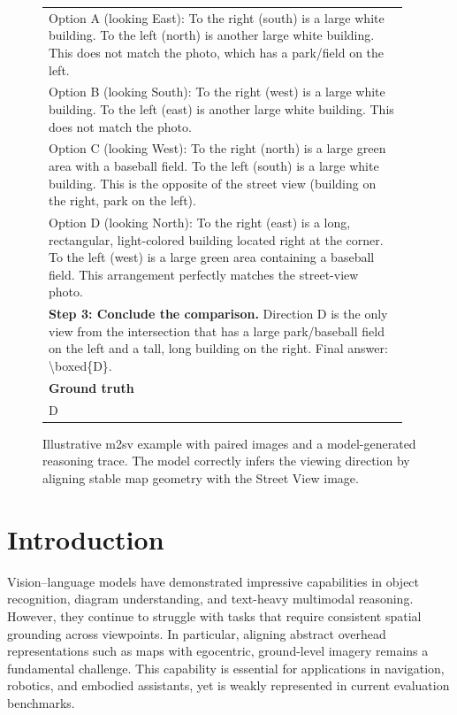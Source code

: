 \documentclass{article}
\begin{document}
\begin{figure}[!t]
\begin{minipage}[t]{0.71\linewidth}
\begin{tabular}{p{0.96\linewidth}}
      Option A (looking East): To the right (south) is a large white building. To the left (north) is another large white building. This does not match the photo, which has a park/field on the left. \\
      Option B (looking South): To the right (west) is a large white building. To the left (east) is another large white building. This does not match the photo. \\
      Option C (looking West): To the right (north) is a large green area with a baseball field. To the left (south) is a large white building. This is the opposite of the street view (building on the right, park on the left). \\
      Option D (looking North): To the right (east) is a long, rectangular, light-colored building located right at the corner. To the left (west) is a large green area containing a baseball field. This arrangement perfectly matches the street-view photo. \\
      \textbf{Step 3: Conclude the comparison.} Direction D is the only view from the intersection that has a large park/baseball field on the left and a tall, long building on the right. Final answer: \textbackslash boxed\{D\}. \\
      \midrule
      \textbf{Ground truth} \\
      D \\
      \bottomrule
    \end{tabular}
  \end{minipage}

  \caption{Illustrative m2sv example with paired images and a model-generated
  reasoning trace. The model correctly infers the viewing direction by aligning
  stable map geometry with the Street View image.}
  \label{fig:m2sv-example}
\end{figure}

\section{Introduction}

Vision--language models have demonstrated impressive capabilities in object
recognition, diagram understanding, and text-heavy multimodal reasoning.
However, they continue to struggle with tasks that require consistent spatial
grounding across viewpoints. In particular, aligning abstract overhead
representations such as maps with egocentric, ground-level imagery remains a
fundamental challenge. This capability is essential for applications in
navigation, robotics, and embodied assistants, yet is weakly represented in
current evaluation benchmarks.
\end{document}
